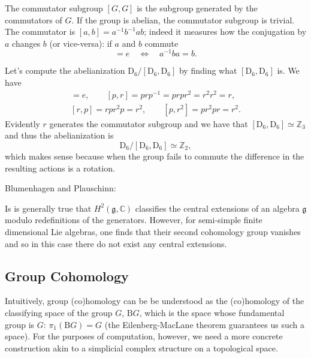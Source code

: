 \documentclass{report}
\begin{document}
 The commutator subgroup $ [G, G] $ is the subgroup generated 
by the commutators of $ G $. If the group is abelian, the commutator subgroup 
is trivial. The commutator is $ [a,b] = a^{-1} b^{-1} a b$; indeed it measures how 
the conjugation by $ a $ changes $ b $ (or vice-versa): if $ a $ and $ b $
commute
\begin{equation*}
	[a,b] = e \quad \iff \quad a^{-1} b a = b.
\end{equation*}

 Let's compute the abelianization $ \text{D}_6 /
[\text{D}_6,\text{D}_6] $ by finding what $ [\text{D}_6, \text{D}_6] $ is. 
We have 
\begin{align*}
	[r, r^2] = e, \qquad [p, r] = prp^{-1} = prpr^2 = r^2 r^2 = r, \\ 
	[r, p] = rpr^2 p = r^2 ,\qquad [p, r^2] = pr^2 pr = r^2.
\end{align*}
Evidently $ r $ generates the commutator subgroup and we have that $
[\text{D}_6, \text{D}_6] \simeq \mathbb{Z}_3$ and thus the abelianization is 
\begin{equation*}
	\text{D}_6/[\text{D}_6, \text{D}_6] \simeq \mathbb{Z}_2,
\end{equation*}
which makes sense because when the group fails to commute the difference in the 
resulting actions is a rotation.


Blumenhagen and Plauschinn: 

\begin{quotebox}
Is is generally true that $ H^2(\mathfrak{g},\mathbb{C}) $ classifies the central 
extensions of an algebra $ \mathfrak{g} $ modulo redefinitions of the generators. 
However, for semi-simple finite dimensional Lie algebras, one finds that their
second cohomology group vanishes and so in this case there do not exist any
central extensions.
\end{quotebox}

\subsection{Group Cohomology}
Intuitively, group (co)homology can be be understood as
the (co)homology of the classifying space of the group $ G $, $ \mathrm{B}G $,
which is the space whose fundamental group is $ G $: $ \pi_1(\text{B}G) = G $
(the Eilenberg-MacLane theorem guarantees us such a space). 
For the purposes of
computation, however, we need a more concrete construction akin to a simplicial
complex structure on a topological space. 
\end{document}
